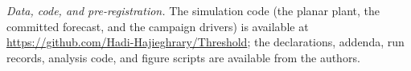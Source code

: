 \noindent\textit{Data, code, and pre-registration.} The simulation code (the planar plant, the committed forecast, and the campaign drivers) is available at \url{https://github.com/Hadi-Hajieghrary/Threshold}; the declarations, addenda, run records, analysis code, and figure scripts are available from the authors.
